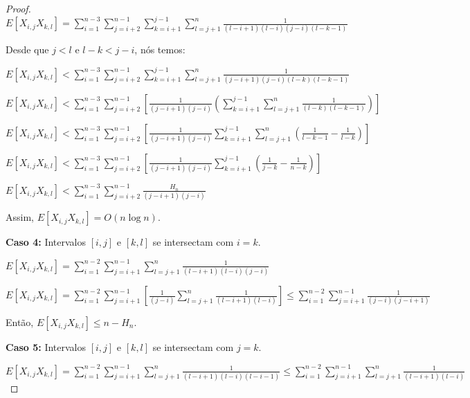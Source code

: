 \documentclass[12pt]{article}
\begin{document}
\begin{proof}
$E[X_{i,j} X_{k,l}] = \sum\limits_{i=1}^{n-3} \sum\limits_{j=i+2}^{n-1}
\sum\limits_{k=i+1}^{j-1} \sum\limits_{l=j+1}^{n} \frac{1}{(l-i+1)(l-i)(j-i)(l-k-1)}$


Desde que $j < l$ e $ l - k < j - i$, nós temos:

$E[X_{i,j} X_{k,l}] < \sum\limits_{i=1}^{n-3} \sum\limits_{j=i+2}^{n-1}
\sum\limits_{k=i+1}^{j-1} \sum\limits_{l=j+1}^{n} \frac{1}{(j-i+1)(j-i)(l-k)(l-k-1)}$

$E[X_{i,j} X_{k,l}] < \sum\limits_{i=1}^{n-3} \sum\limits_{j=i+2}^{n-1}
\left[ \frac{1}{(j-i+1)(j-i)}  \left( \sum\limits_{k=i+1}^{j-1} \sum\limits_{l=j+1}^{n} \frac{1}{(l-k)(l-k-1)} \right) \right]$

$E[X_{i,j} X_{k,l}] < \sum\limits_{i=1}^{n-3} \sum\limits_{j=i+2}^{n-1}
\left[ \frac{1}{(j-i+1)(j-i)}  \sum\limits_{k=i+1}^{j-1} \sum\limits_{l=j+1}^{n}  \left(  \frac{1}{l-k-1} - \frac{1}{l-k}  \right) \right]$

$E[X_{i,j} X_{k,l}] < \sum\limits_{i=1}^{n-3} \sum\limits_{j=i+2}^{n-1}
\left[ \frac{1}{(j-i+1)(j-i)}  \sum\limits_{k=i+1}^{j-1}  \left(  \frac{1}{j-k} - \frac{1}{n-k}  \right) \right]$

$E[X_{i,j} X_{k,l}] < \sum\limits_{i=1}^{n-3} \sum\limits_{j=i+2}^{n-1}
\frac{H_{n}}{(j-i+1)(j-i)} $

Assim, $E[X_{i,j} X_{k,l}] = O(n \log n)$.

\vspace{0.5cm}

{\bf Caso 4:} Intervalos $[i, j]$ e $[k, l]$ se intersectam com $i = k$.

$E[X_{i,j} X_{k,l}] = \sum\limits_{i=1}^{n-2}
\sum\limits_{j=i+1}^{n-1} \sum\limits_{l=j+1}^{n} \frac{1}{(l-i+1)(l-i)(j-i)}$

$E[X_{i,j} X_{k,l}] = \sum\limits_{i=1}^{n-2}
\sum\limits_{j=i+1}^{n-1} \left[ \frac{1}{(j-i)} \sum\limits_{l=j+1}^{n} \frac{1}{(l-i+1)(l-i)} \right]
\leq \sum\limits_{i=1}^{n-2}
\sum\limits_{j=i+1}^{n-1} \frac{1}{(j-i)(j-i+1)}$

Então, $E[X_{i,j} X_{k,l}] \leq n - H_{n}$.

\vspace{0.5cm}

{\bf Caso 5:} Intervalos $[i, j]$ e $[k, l]$ se intersectam com $j = k$.

$E[X_{i,j} X_{k,l}] = \sum\limits_{i=1}^{n-2}
\sum\limits_{j=i+1}^{n-1} \sum\limits_{l=j+1}^{n} \frac{1}{(l-i+1)(l-i)(l-i-1)}
\leq \sum\limits_{i=1}^{n-2}
\sum\limits_{j=i+1}^{n-1} \sum\limits_{l=j+1}^{n} \frac{1}{(l-i+1)(l-i)}
$


\end{proof}
\end{document}
